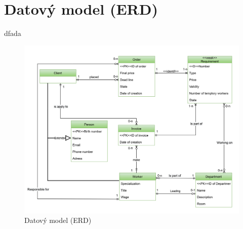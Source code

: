 \documentclass[11pt, a4paper]{article}
\begin{document}
    \newpage
    \section{Datový model (ERD)}
    dfada
	\begin{figure}[ht]
		\centering

		\includegraphics[width=1 \linewidth]{er_diagram.png}
		\caption{Datový model (ERD)}
	\end{figure}
\end{document}
